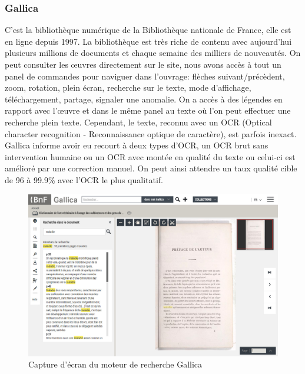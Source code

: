         \subsubsection{Gallica}
        \label{subsubsec:gallica}
        C’est la bibliothèque numérique de la Bibliothèque nationale de France, elle est en ligne depuis 1997.
        La bibliothèque est très riche de contenu avec aujourd’hui plusieurs millions de documents
        et chaque semaine des milliers de nouveautés. On peut consulter les œuvres directement sur le site,
        nous avons accès à tout un panel de commandes pour naviguer dans l’ouvrage: flèches suivant/précèdent,
        zoom, rotation, plein écran, recherche sur le texte, mode d’affichage, téléchargement, partage,
        signaler une anomalie. On a accès à des légendes en rapport avec l’œuvre et dans le même panel
        au texte où l’on peut effectuer une recherche plein texte. Cependant, le texte, reconnu avec un OCR
        (Optical character recognition - Reconnaissance optique de caractère), est parfois inexact.
        Gallica informe avoir eu recourt à deux types d’OCR, un OCR brut sans intervention humaine ou un OCR
        avec montée en qualité du texte ou celui-ci est amélioré par une correction manuel. On peut ainsi
        attendre un taux qualité cible de 96 à 99.9\% avec l’OCR le plus qualitatif. 

        \begin{figure}[ht!]
            \centering
            \includegraphics[width=1\textwidth]{figure/screenshot_gallica.jpg}
            \caption{Capture d'écran du moteur de recherche Gallica}
            \label{fig:gallica}
        \end{figure}


